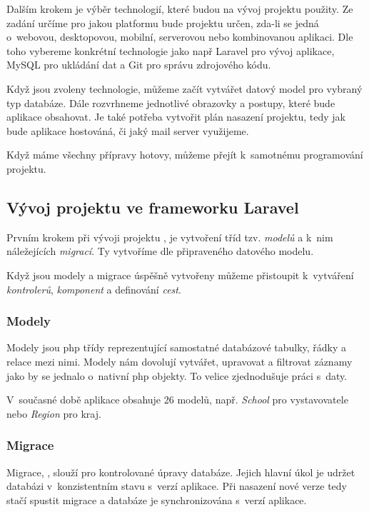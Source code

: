 Dalším krokem je výběr technologií, které budou na vývoj projektu použity.
Ze zadání určíme pro jakou platformu bude projektu určen, zda-li se jedná o~webovou, desktopovou, mobilní, serverovou nebo kombinovanou aplikaci.
Dle toho vybereme konkrétní technologie jako např Laravel\cite{laravel} pro vývoj aplikace, MySQL\cite{mysql} pro ukládání dat a Git\cite{git} pro správu zdrojového kódu.

Když jsou zvoleny technologie, můžeme začít vytvářet datový model pro vybraný typ databáze.
Dále rozvrhneme jednotlivé obrazovky a postupy, které bude aplikace obsahovat.
Je také potřeba vytvořit plán nasazení projektu, tedy jak bude aplikace hostováná, či jaký mail server využijeme.

Když máme všechny přípravy hotovy, můžeme přejít k~samotnému programování projektu.

\subsection{Vývoj projektu ve frameworku Laravel}
\label{sub:laravel-development}

Prvním krokem při vývoji projektu \inlaravel, je vytvoření tříd tzv. \emph{modelů}\cite{laravel-models} a k~nim náležejících \emph{migrací}\cite{laravel-migrations}. Ty vytvoříme dle připraveného datového modelu.

Když jsou modely a migrace úspěšně vytvořeny můžeme přistoupit k~vytváření \emph{kontrolerů}\cite{laravel-controller}, \emph{komponent}\cite{laravel-blade-component} a definování \emph{cest}\cite{laravel-routes}.

\subsubsection{Modely}

Modely jsou \acrshort{php} třídy reprezentující samostatné databázové tabulky, řádky a relace mezi nimi. Modely nám dovolují vytvářet, upravovat a filtrovat záznamy jako by se jednalo o~nativní \acrshort{php} objekty. To velice zjednodušuje práci s~daty.

V~současné době aplikace \bso{} obsahuje 26 modelů, např. \emph{School} pro vystavovatele nebo \emph{Region} pro kraj. 

\subsubsection{Migrace}

Migrace, \inlaravel, slouží pro kontrolované úpravy databáze. Jejich hlavní úkol je udržet databázi v~konzistentním stavu s~verzí aplikace. Při nasazení nové verze tedy stačí spustit migrace a databáze je synchronizována s~verzí aplikace.

